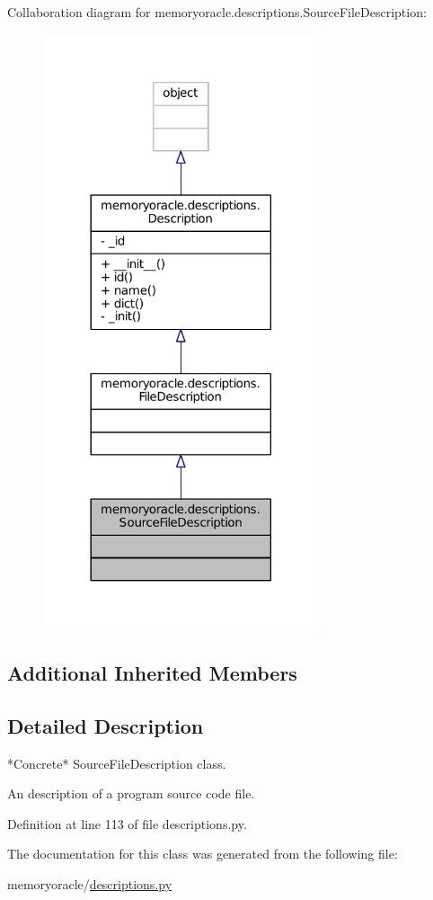 Collaboration diagram for memoryoracle.\+descriptions.\+Source\+File\+Description\+:\nopagebreak
\begin{figure}[H]
\begin{center}
\leavevmode
\includegraphics[width=230pt]{classmemoryoracle_1_1descriptions_1_1SourceFileDescription__coll__graph}
\end{center}
\end{figure}
\subsection*{Additional Inherited Members}


\subsection{Detailed Description}
\begin{DoxyVerb}*Concrete* SourceFileDescription class.

An description of a program source code file.
\end{DoxyVerb}
 

Definition at line 113 of file descriptions.\+py.



The documentation for this class was generated from the following file\+:\begin{DoxyCompactItemize}
\item 
memoryoracle/\hyperlink{descriptions_8py}{descriptions.\+py}\end{DoxyCompactItemize}

